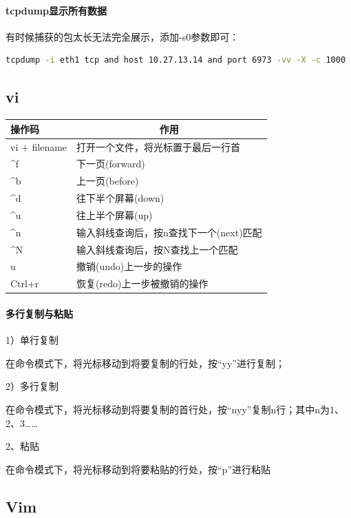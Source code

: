 \documentclass{book}
\begin{document}
\paragraph{tcpdump显示所有数据}

有时候捕获的包太长无法完全展示，添加-s0参数即可：

\begin{lstlisting}[language=Bash]
tcpdump -i eth1 tcp and host 10.27.13.14 and port 6973 -vv -X -c 1000
\end{lstlisting}

\subsection{vi}

\begin{tabular}{l|p{10cm}}
	\multirow{1}{*}{操作码}			
	& \multicolumn{1}{c}{作用}\\	 
	\hline
	vi + filename & 打开一个文件，将光标置于最后一行首\\
	\hline
	\textasciicircum f & 下一页(forward)\\
	\hline 
	\textasciicircum b & 上一页(before)\\
	\hline
	\textasciicircum d & 往下半个屏幕(down)\\
	\hline
	\textasciicircum u & 往上半个屏幕(up)\\
	\hline
	\textasciicircum n & 输入斜线查询后，按n查找下一个(next)匹配\\
	\hline
	\textasciicircum N & 输入斜线查询后，按N查找上一个匹配\\
	\hline
	u & 撤销(undo)上一步的操作\\
	\hline
	Ctrl+r & 恢复(redo)上一步被撤销的操作\\
	\hline
	\end{tabular}

\paragraph{多行复制与粘贴}

1）单行复制

在命令模式下，将光标移动到将要复制的行处，按“yy”进行复制；

2）多行复制

在命令模式下，将光标移动到将要复制的首行处，按“nyy”复制n行；其中n为1、2、3……

2、粘贴

在命令模式下，将光标移动到将要粘贴的行处，按“p”进行粘贴

\subsection{Vim}
\end{document}
